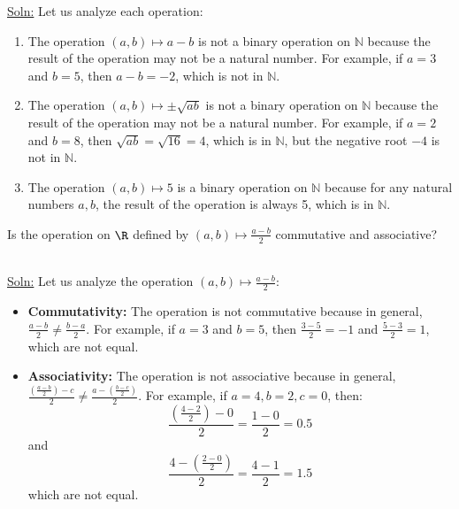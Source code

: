 \documentclass[openany]{book}
\begin{document}
\underline{Soln:} Let us analyze each operation:
\begin{enumerate}
    \item The operation \( (a, b) \mapsto a - b \) is not a binary operation on \( \mathbb{N} \) because the result of the operation may not be a natural number. For example, if \( a = 3 \) and \( b = 5 \), then \( a - b = -2 \), which is not in \( \mathbb{N} \).
    \item The operation \( (a, b) \mapsto \pm \sqrt{ab} \) is not a binary operation on \( \mathbb{N} \) because the result of the operation may not be a natural number. For example, if \( a = 2 \) and \( b = 8 \), then \( \sqrt{ab} = \sqrt{16} = 4 \), which is in \( \mathbb{N} \), but the negative root \( -4 \) is not in \( \mathbb{N} \).
    \item The operation \( (a, b) \mapsto 5 \) is a binary operation on \( \mathbb{N} \) because for any natural numbers \( a, b \), the result of the operation is always 5, which is in \( \mathbb{N} \).
\end{enumerate}
\begin{exercise}
    Is the operation on $\R$ defined by \( (a, b) \mapsto \frac{a-b}{2} \) commutative and associative?
\end{exercise} \\
\underline{Soln:} Let us analyze the operation \( (a, b) \mapsto \frac{a-b}{2} \):
\begin{itemize}
    \item \textbf{Commutativity:} The operation is not commutative because in general, \( \frac{a-b}{2} \neq \frac{b-a}{2} \). For example, if \( a = 3 \) and \( b = 5 \), then \( \frac{3-5}{2} = -1 \) and \( \frac{5-3}{2} = 1 \), which are not equal.
    \item \textbf{Associativity:} The operation is not associative because in general, \( \frac{\left(\frac{a-b}{2}\right)-c}{2} \neq \frac{a-\left(\frac{b-c}{2}\right)}{2} \). For example, if \( a = 4, b = 2, c = 0 \), then:
    \[
    \frac{\left(\frac{4-2}{2}\right)-0}{2} = \frac{1-0}{2} = 0.5
    \]
    and
    \[
    \frac{4-\left(\frac{2-0}{2}\right)}{2} = \frac{4-1}{2} = 1.5
    \]
    which are not equal.
\end{itemize}
\end{document}
